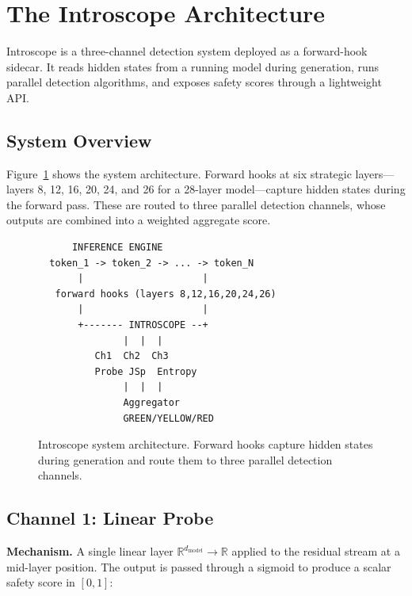 \documentclass[11pt,twocolumn]{article}
\begin{document}
\section{The Introscope Architecture}

\label{sec:method}

Introscope is a three-channel detection system deployed as a forward-hook sidecar. It reads hidden states from a running model during generation, runs parallel detection algorithms, and exposes safety scores through a lightweight API.

\subsection{System Overview}

Figure~\ref{fig:architecture} shows the system architecture. Forward hooks at six strategic layers---layers 8, 12, 16, 20, 24, and 26 for a 28-layer model---capture hidden states during the forward pass. These are routed to three parallel detection channels, whose outputs are combined into a weighted aggregate score.

\begin{figure}[h]
\centering
\begin{minipage}{0.9\columnwidth}
\footnotesize
\begin{verbatim}
      INFERENCE ENGINE
  token_1 -> token_2 -> ... -> token_N
       |                     |
   forward hooks (layers 8,12,16,20,24,26)
       |                     |
       +------- INTROSCOPE --+
               |  |  |
          Ch1  Ch2  Ch3
          Probe JSp  Entropy
               |  |  |
               Aggregator
               GREEN/YELLOW/RED
\end{verbatim}
\end{minipage}
\caption{Introscope system architecture. Forward hooks capture hidden states during generation and route them to three parallel detection channels.}
\label{fig:architecture}
\end{figure}

\subsection{Channel 1: Linear Probe}

\textbf{Mechanism.} A single linear layer $\mathbb{R}^{d_{\text{model}}} \to \mathbb{R}$ applied to the residual stream at a mid-layer position. The output is passed through a sigmoid to produce a scalar safety score in $[0, 1]$:
\end{document}
